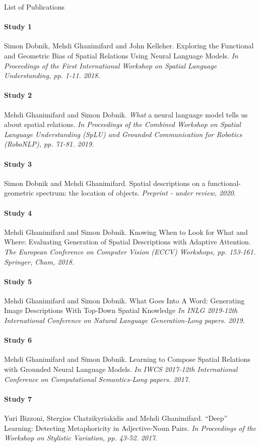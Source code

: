 \clearpage
{List of Publications}\label{sec:abstract:publications} \\



\paragraph{Study 1}
Simon Dobnik, Mehdi Ghanimifard and John Kelleher. 
Exploring the Functional and Geometric Bias of Spatial Relations Using Neural Language Models.
\textit{In Proceedings of the First International Workshop on Spatial Language Understanding, pp. 1-11. 2018.}

\paragraph{Study 2}
Mehdi Ghanimifard and Simon Dobnik. 
\emph{What} a neural language model tells us about spatial relations. 
\textit{In Proceedings of the Combined Workshop on Spatial Language Understanding (SpLU) and Grounded Communication for Robotics (RoboNLP), pp. 71-81. 2019.}

\paragraph{Study 3}
Simon Dobnik and Mehdi Ghanimifard.
Spatial descriptions on a functional-geometric spectrum: the location of objects. 
\textit{Preprint - under review, 2020.}

\paragraph{Study 4}
Mehdi Ghanimifard and Simon Dobnik. 
Knowing When to Look for What and Where: Evaluating Generation of Spatial Descriptions with Adaptive Attention. 
\textit{The European Conference on Computer Vision (ECCV) Workshops, pp. 153-161. Springer, Cham, 2018.}

\paragraph{Study 5}
Mehdi Ghanimifard and Simon Dobnik.
What Goes Into A Word: Generating Image Descriptions With Top-Down Spatial Knowledge
\textit{In INLG 2019-12th International Conference on Natural Language Generation-Long papers. 2019.}

\paragraph{Study 6}
Mehdi Ghanimifard and Simon Dobnik. 
Learning to Compose Spatial Relations with Grounded Neural Language Models. 
\textit{In IWCS 2017-12th International Conference on Computational Semantics-Long papers. 2017.}

\paragraph{Study 7}
Yuri Bizzoni, Stergios Chatzikyriakidis and Mehdi Ghanimifard. 
``Deep'' Learning: Detecting Metaphoricity in Adjective-Noun Pairs.
\textit{In Proceedings of the Workshop on Stylistic Variation, pp. 43-52. 2017.}


